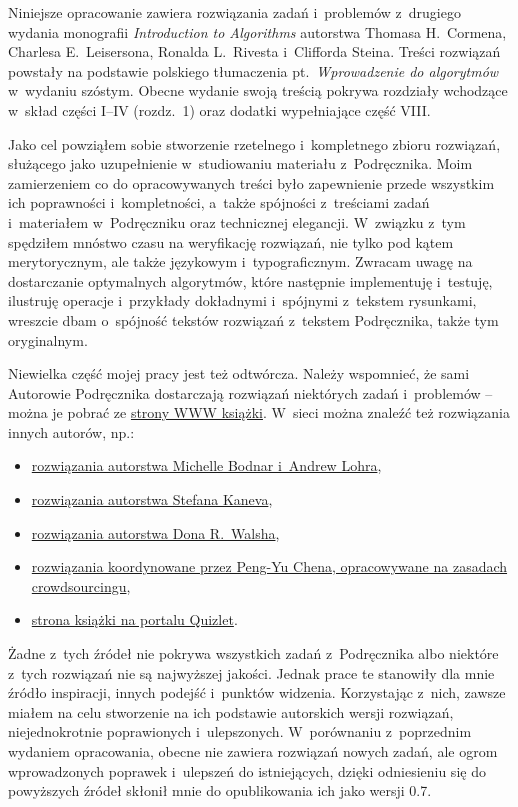 
Niniejsze opracowanie zawiera rozwiązania zadań i~problemów z~drugiego wydania monografii \textsl{Introduction to Algorithms} \cite{clrs2} autorstwa Thomasa H.\ Cormena, Charlesa E.\ Leisersona, Ronalda L.\ Rivesta i~Clifforda Steina.
Treści rozwiązań powstały na podstawie polskiego tłumaczenia pt.\ \textsl{Wprowadzenie do algorytmów} \cite{clrs2pl} w~wydaniu szóstym.
Obecne wydanie swoją treścią pokrywa rozdziały wchodzące w~skład części I--IV (rozdz.\ 1) oraz dodatki wypełniające część VIII\@.

Jako cel powziąłem sobie stworzenie rzetelnego i~kompletnego zbioru rozwiązań, służącego jako uzupełnienie w~studiowaniu materiału z~Podręcznika.
Moim zamierzeniem co do opracowywanych treści było zapewnienie przede wszystkim ich poprawności i~kompletności, a~także spójności z~treściami zadań i~materiałem w~Podręczniku oraz technicznej elegancji.
W~związku z~tym spędziłem mnóstwo czasu na weryfikację rozwiązań, nie tylko pod kątem merytorycznym, ale także językowym i~typograficznym.
Zwracam uwagę na dostarczanie optymalnych algorytmów, które następnie implementuję i~testuję, ilustruję operacje i~przykłady dokładnymi i~spójnymi z~tekstem rysunkami, wreszcie dbam o~spójność tekstów rozwiązań z~tekstem Podręcznika, także tym oryginalnym.

Niewielka część mojej pracy jest też odtwórcza.
Należy wspomnieć, że sami Autorowie Podręcznika dostarczają rozwiązań niektórych zadań i~problemów -- można je pobrać ze \href{http://mitpress.mit.edu/algorithms}{strony WWW książki}.
W~sieci można znaleźć też rozwiązania innych autorów, np.:
\begin{itemize}
    \item \href{http://sites.math.rutgers.edu/~ajl213/CLRS/CLRS.html}{rozwiązania autorstwa Michelle Bodnar i~Andrew Lohra},
    \item \href{https://ita.skanev.com}{rozwiązania autorstwa Stefana Kaneva},
    \item \href{https://donrwalsh.github.io/CLRS/}{rozwiązania autorstwa Dona R.\ Walsha},
    \item \href{https://walkccc.github.io/CLRS}{rozwiązania koordynowane przez Peng-Yu Chena, opracowywane na zasadach crowdsourcingu},
    \item \href{https://quizlet.com/explanations/textbook-solutions/introduction-to-algorithms-2nd-edition-9780262032933}{strona książki na portalu Quizlet}.
\end{itemize}
Żadne z~tych źródeł nie pokrywa wszystkich zadań z~Podręcznika albo niektóre z~tych rozwiązań nie są najwyższej jakości.
Jednak prace te stanowiły dla mnie źródło inspiracji, innych podejść i~punktów widzenia.
Korzystając z~nich, zawsze miałem na celu stworzenie na ich podstawie autorskich wersji rozwiązań, niejednokrotnie poprawionych i~ulepszonych.
W~porównaniu z~poprzednim wydaniem opracowania, obecne nie zawiera rozwiązań nowych zadań, ale ogrom wprowadzonych poprawek i~ulepszeń do istniejących, dzięki odniesieniu się do powyższych źródeł skłonił mnie do opublikowania ich jako wersji 0.7.

